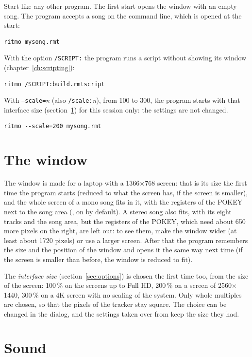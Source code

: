Start \RITMO{} like any other program. The first start opens the window with an empty song.
The program accepts a song on the command line, which is opened at the start:
\begin{lstlisting}
ritmo mysong.rmt
\end{lstlisting}

With the option \texttt{/SCRIPT:} the program runs a script without showing its window
(chapter~\ref{ch:scripting}):
\begin{lstlisting}
ritmo /SCRIPT:build.rmtscript
\end{lstlisting}

With \texttt{--scale=}\emph{n} (also \texttt{/scale:}\emph{n}), from 100 to 300, the program starts with that interface size
(section~\ref{sec:window}) for this session only: the settings are not changed.
\begin{lstlisting}
ritmo --scale=200 mysong.rmt
\end{lstlisting}

\section{The window}\label{sec:window}

The window is made for a laptop with a 1366$\times$768 screen: that is its size the first time the program starts (reduced to what the screen has, if
the screen is smaller), and the whole screen of a mono song fits in it, with the registers of the POKEY next to the song area (, on by
default). A stereo song also fits, with its eight tracks and the song area, but the registers of the POKEY, which need about 650 more pixels on
the right, are left out: to see them, make the window wider (at least about 1720 pixels) or use a larger screen. After that the program remembers the size and the position of the window
and opens it the same way next time (if the screen is smaller than before, the window is reduced to fit).

The \emph{interface size} (section~\ref{sec:options}) is chosen the first time too, from the size of the screen: 100\,\% on the screens up to Full HD,
200\,\% on a screen of 2560$\times$1440, 300\,\% on a 4K screen with no scaling of the system. Only whole multiples are chosen, so that the pixels of the
tracker stay square. The choice can be changed in the  dialog, and the settings taken over from \RMT{} keep the size they had.

\section{Sound}

